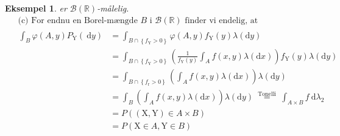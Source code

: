 \documentclass{article}
\newcommand{\1}{\mathbbm{1}}
\theoremstyle{boxed}
\newtheorem{example}[theorem]{Eksempel}
\begin{document}
\begin{example}
er $\mathcal{B}(\mathbb{R})$-målelig.
$$
\begin{aligned}
&\text { (c) For endnu en Borel-mængde } B \text { i } \mathcal{B}(\mathbb{R}) \text { finder vi endelig, at }\\
&\begin{aligned}
\int_B \varphi(A, y) P_{\mathrm{Y}}(\mathrm{~d} y) & =\int_{B \cap\left\{f_{\mathrm{Y}}>0\right\}} \varphi(A, y) f_{\mathrm{Y}}(y) \lambda(\mathrm{d} y) \\
& =\int_{B \cap\left\{f_{\mathrm{Y}}>0\right\}}\left(\frac{1}{f_{\mathrm{Y}}(y)} \int_A f(x, y) \lambda(\mathrm{d} x)\right) f_{\mathrm{Y}}(y) \lambda(\mathrm{d} y) \\
& =\int_{B \cap\left\{f_{\mathrm{r}}>0\right\}}\left(\int_A f(x, y) \lambda(\mathrm{d} x)\right) \lambda(\mathrm{d} y) \\
& =\int_B\left(\int_A f(x, y) \lambda(\mathrm{d} x)\right) \lambda(\mathrm{d} y) \stackrel{\text { Tonelli }}{=} \int_{A \times B} f \mathrm{~d} \lambda_2 \\
& =P((\mathrm{X}, \mathrm{Y}) \in A \times B) \\
& =P(\mathrm{X} \in A, \mathrm{Y} \in B)
\end{aligned}
\end{aligned}
$$
\end{example}
\end{document}
